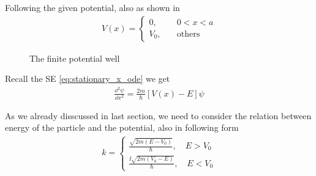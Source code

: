 Following the given potential, also as shown in 
\begin{eqnarray}
    V(x) = \begin{cases}
        0, \quad  &0<x<a\\
        V_0, \quad &\mathrm{others}
        \end{cases}
\end{eqnarray}

\begin{figure}[h!]
    \centering
    \caption{The finite potential well}
    \label{fig:finite_potential_well}
\end{figure}

Recall the SE \cref{eq:stationary_x_ode} we get 
\begin{eqnarray}
    \frac{\dd^2 \psi}{\dd x^2} = \frac{2m}{\hbar} \left[ V(x) - E \right] \psi
\end{eqnarray}

As we already disscussed in last section, we need to consider the relation between energy of the particle and the potential, also in following form 
\begin{align}
    k = \begin{cases}
        \frac{\sqrt{2m(E - V_0)}}{\hbar}, \quad E> V_0 \\
        \frac{\ii\sqrt{2m(V_0 - E)}}{\hbar}, \quad E< V_0
    \end{cases}
\end{align}


\newpage

